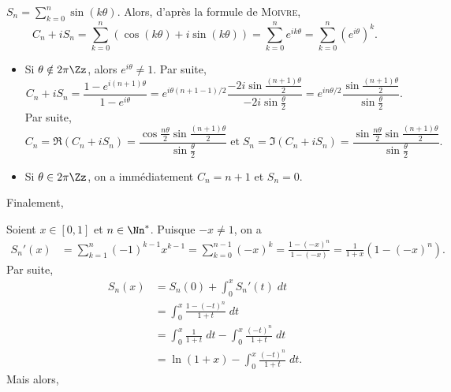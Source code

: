 {\begin{enumerate}
{$S_n=\sum_{k=0}^{n}\sin(k\theta)$. Alors, d'après la formule de \textsc{Moivre},
$$C_n+iS_n=\sum_{k=0}^{n}(\cos(k\theta)+i\sin(k\theta))=\sum_{k=0}^{n}e^{ik\theta}=\sum_{k=0}^{n}(e^{i\theta})^k.$$
\begin{itemize}
\item[\textbf{- 1er cas.}] Si $\theta\notin2\pi\Zz$, alors $e^{i\theta}\neq1$. Par suite,
$$C_n+iS_n=\frac{1-e^{i(n+1)\theta}}{1-e^{i\theta}}=e^{i\theta(n+1-1)/2}\frac{-2i\sin\frac{(n+1)\theta}{2}}{-2i\sin
\frac{\theta}{2}}=e^{in\theta/2}\frac{\sin\frac{(n+1)\theta}{2}}{\sin
\frac{\theta}{2}}.$$
Par suite,
$$C_n=\Re(C_n+iS_n)=\frac{\cos\frac{n\theta}{2}\sin\frac{(n+1)\theta}{2}}{\sin\frac{\theta}{2}}\;\mbox{et}\;S_n=\Im(C_
n+iS_n)=\frac{\sin\frac{n\theta}{2}\sin\frac{(n+1)\theta}{2}}{\sin\frac{\theta}{2}}.$$
\item[\textbf{- 2ème cas.}] Si $\theta\in2\pi\Zz$, on a immédiatement $C_n=n+1$ et $S_n=0$.
\end{itemize}
Finalement,
\begin{center}
\end{center}
Soient $x\in[0,1]$ et $n\in\Nn^*$. Puisque $-x\neq1$, on a
\begin{align*}
S_n'(x)&=\sum_{k=1}^{n}(-1)^{k-1}x^{k-1}=\sum_{k=0}^{n-1}(-x)^{k}=\frac{1-(-x)^{n}}{1-(-x)}=\frac{1}{1+x}(1-(-x)^{n}).
\end{align*}
Par suite,
\begin{align*}
S_n(x) &= S_n(0)+\int_{0}^{x}S_n'(t)\;dt \\
&= \int_{0}^{x}\frac{1-(-t)^{n}}{1+t}\;dt \\
&= \int_{0}^{x}\frac{1}{1+t}\;dt- \int_{0}^{x}\frac{(-t)^{n}}{1+t}\;dt \\
&= \ln(1+x)-\int_{0}^{x}\frac{(-t)^{n}}{1+t}\;dt.
\end{align*}
Mais alors,
\begin{align*}

\end{align*}}
\end{enumerate}}

